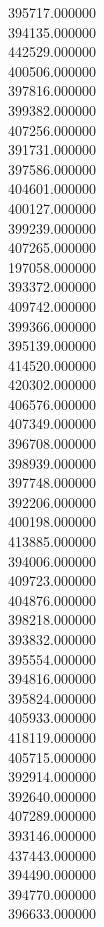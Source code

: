 395717.000000\\
394135.000000\\
442529.000000\\
400506.000000\\
397816.000000\\
399382.000000\\
407256.000000\\
391731.000000\\
397586.000000\\
404601.000000\\
400127.000000\\
399239.000000\\
407265.000000\\
197058.000000\\
393372.000000\\
409742.000000\\
399366.000000\\
395139.000000\\
414520.000000\\
420302.000000\\
406576.000000\\
407349.000000\\
396708.000000\\
398939.000000\\
397748.000000\\
392206.000000\\
400198.000000\\
413885.000000\\
394006.000000\\
409723.000000\\
404876.000000\\
398218.000000\\
393832.000000\\
395554.000000\\
394816.000000\\
395824.000000\\
405933.000000\\
418119.000000\\
405715.000000\\
392914.000000\\
392640.000000\\
407289.000000\\
393146.000000\\
437443.000000\\
394490.000000\\
394770.000000\\
396633.000000\\
